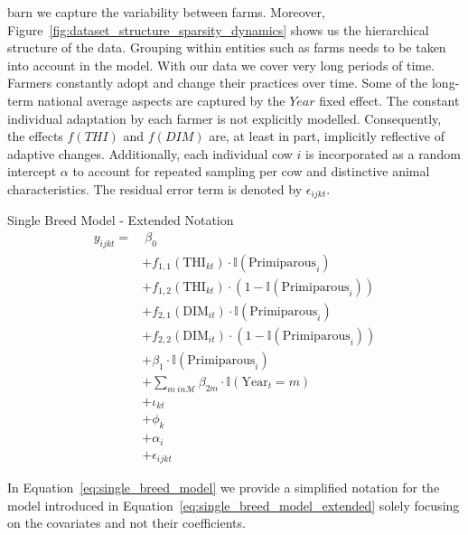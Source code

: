 barn we capture the variability between farms. Moreover, Figure~\ref{fig:dataset_structure_sparsity_dynamics} shows us the hierarchical structure of the data. Grouping within entities such as farms needs to be taken into account in the model. With our data we cover very long periods of time. Farmers constantly adopt and change their practices over time. Some of the long-term national average aspects are captured by the $\textit{Year}$ fixed effect. The constant individual adaptation by each farmer is not explicitly modelled. Consequently, the effects \( f(THI) \) and \( f(DIM) \) are, at least in part, implicitly reflective of adaptive changes. Additionally, each individual cow $i$ is incorporated as a random intercept $\alpha$ to account for repeated sampling per cow and distinctive animal characteristics. The residual error term is denoted by $\epsilon_{ijkt}$.

\begin{defi}Single Breed Model - Extended Notation
\begin{equation}\label{eq:single_breed_model_extended}
    \begin{aligned}
        y_{ijkt} = & \ \beta_0 \\
        & + f_{1,1}(\text{THI}_{kt}) \cdot \mathbb{I}(\text{Primiparous}_i) \\
        & + f_{1,2}(\text{THI}_{kt}) \cdot (1 - \mathbb{I}(\text{Primiparous}_i)) \\
        & + f_{2,1}(\text{DIM}_{it}) \cdot \mathbb{I}(\text{Primiparous}_i) \\
        & + f_{2,2}(\text{DIM}_{it}) \cdot (1 - \mathbb{I}(\text{Primiparous}_i)) \\
        & + \beta_1 \cdot \mathbb{I}(\text{Primiparous}_i) \\
        & + \sum_{m \ in \mathcal{M}} \beta_{2m} \cdot \mathbb{I}(\text{Year}_t = m) \\
        & + \iota_{kt} \\
        & + \phi_k \\
        & + \alpha_i \\ 
        & + \epsilon_{ijkt} 
    \end{aligned}
\end{equation}
\end{defi}

In Equation~\ref{eq:single_breed_model} we provide a simplified notation for the model introduced in Equation~\ref{eq:single_breed_model_extended} solely focusing on the covariates and not their coefficients.


